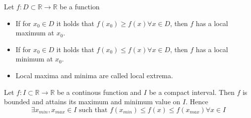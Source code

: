 \begin{definition}
    Let $f: D \subset \mathbb{R} \to \mathbb{R}$ be a function
    \begin{itemize}
        \item If for $x_0 \in D$ it holds that $f(x_0) \geq f(x) \forall x \in D$, then $f$ has a local maximum at $x_0$.
        \item If for $x_0 \in D$ it holds that $f(x_0) \leq f(x) \forall x \in D$, then $f$ has a local minimum at $x_0$.
        \item Local maxima and minima are called local extrema.
    \end{itemize}
\end{definition}

\begin{theorem}
    Let $f: I \subset \mathbb{R} \to \mathbb{R}$ be a continous function and $I$ be a compact interval. Then $f$ is bounded and attains its maximum and minimum value on $I$. Hence
    $$\exists x_{min}, x_{max} \in I \text{ such that } f(x_{min}) \leq f(x) \leq f(x_{max}) \forall x \in I$$
\end{theorem}